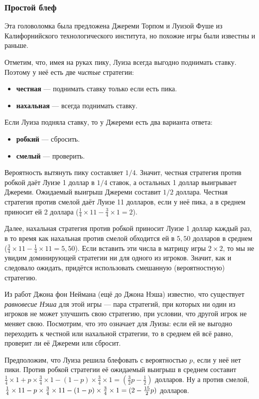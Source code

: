 \subsubsection*{Простой блеф}

Эта головоломка была предложена Джереми Торпом и Луизой Фуше из Калифорнийского технологического института, но похожие игры были известны и раньше.

Отметим, что, имея на руках пику, Луиза всегда выгодно поднимать ставку.
Поэтому у неё есть две \emph{чистые} стратегии:
\begin{itemize}
 \item \textbf{честная} --- поднимать ставку только если есть пика.
 \item \textbf{нахальная} --- всегда поднимать ставку.
\end{itemize}
Если Луиза подняла ставку, то у Джереми есть два варианта ответа:
\begin{itemize}
 \item \textbf{робкий} --- сбросить.
 \item \textbf{смелый} --- проверить.
\end{itemize}

Вероятность вытянуть пику составляет $1/4$.
Значит, честная стратегия против робкой даёт Луизе 1 доллар в $1/4$ ставок, а остальных 1 доллар выигрывает Джереми.
Ожидаемый выигрыш Джереми составит $1/2$ доллара.
Честная стратегия против смелой даёт Луизе 11 долларов, если у неё пика,
а в среднем приносит ей 2 доллара ($\tfrac14 \times 11 - \tfrac 34 \times 1 = 2$).

Далее, нахальная стратегия против робкой приносит Луизе 1 доллар каждый раз,
в то время как нахальная против смелой обходится ей в $5{,}50$ долларов в среднем ($\tfrac34 \times 11- \tfrac14 \times11 = 5{,}50$).
Если вставить эти числа в матрицу игры $2 \times 2$,
то мы не увидим доминирующей стратегии ни для одного из игроков.
Значит, как и следовало ожидать, придётся использовать смешанную (вероятностную) стратегию.

Из работ Джона фон Неймана (ещё до Джона Нэша) известно, что существует \emph{равновесие Нэша} для этой игры --- пара стратегий, при которых ни один из игроков не может улучшить свою стратегию, при условии, что другой игрок не меняет свою.
Посмотрим, что это означает для Луизы: если ей не выгодно переходить к честной или нахальной стратегии, то в среднем ей всё равно, проверит ли её Джереми или сбросит.

Предположим, что Луиза решила блефовать с вероятностью $p$, если у неё нет пики.
Против робкой стратегии её ожидаемый выигрыш в среднем составит $\tfrac14 \times 1 + p \times \tfrac34 \times 1 - (1 - p) \times \tfrac34 \times 1 =(\tfrac32p - \tfrac12)$ долларов.
Ну а против смелой, $\tfrac14 \times 11 - p \times \tfrac34 \times 11 - (1 - p) \times \tfrac34 \times 1 \z= (2 - \tfrac{15}2p)$ долларов.

